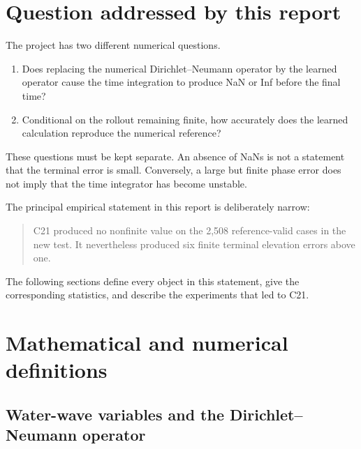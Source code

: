 \documentclass[11pt]{article}
\begin{document}
\tableofcontents
\newpage

\section{Question addressed by this report}

The project has two different numerical questions.

\begin{enumerate}[leftmargin=*]
  \item Does replacing the numerical Dirichlet--Neumann operator by the
  learned operator cause the time integration to produce NaN or Inf before
  the final time?

  \item Conditional on the rollout remaining finite, how accurately does the
  learned calculation reproduce the numerical reference?
\end{enumerate}

These questions must be kept separate.  An absence of NaNs is not a statement
that the terminal error is small.  Conversely, a large but finite phase error
does not imply that the time integrator has become unstable.

The principal empirical statement in this report is deliberately narrow:

\begin{quote}
C21 produced no nonfinite value on the 2,508 reference-valid cases in the new
test.  It nevertheless produced six finite terminal elevation errors above
one.
\end{quote}

The following sections define every object in this statement, give the
corresponding statistics, and describe the experiments that led to C21.

\section{Mathematical and numerical definitions}

\subsection{Water-wave variables and the Dirichlet--Neumann operator}
\end{document}
